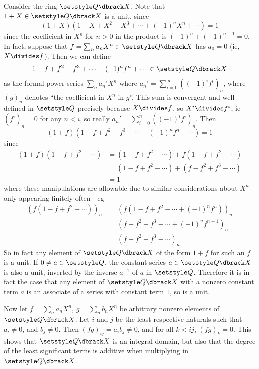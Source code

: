 \documentclass[fleqn,a4paper,11pt]{article}
\begin{document}
Consider the ring \(\Q\dbrack X\). Note that \(1 + X \in \Q\dbrack X\) is a
unit, since
\begin{equation*}
 (1 + X)(1 - X + X^2 - X^3 + \dotsb + (-1)^n X^n + \dotsb) = 1
\end{equation*}
since the coefficient in \(X^n\) for \(n > 0\) in the product is
\((-1)^n + (-1)^{n + 1} = 0\). In fact, suppose that
\(f = \sum_n a_n X^n \in \Q\dbrack X\) has \(a_0 = 0\) (ie, \(X \divides f\)).
Then we can define
\begin{equation*}
 1 - f + f^2 - f^3 + \dotsb + (-1)^n f^n + \dotsb \in \Q\dbrack X
\end{equation*}
as the formal power series \(\sum_n a_n' X^n\) where
\(a_n' = \sum_{i = 0}^\infty ((-1)^i f^i)_n\), where \((g)_n\) denotes ``the
coefficient in \(X^n\) in \(g\)''. This sum is convergent and well-defined in
\(\Q\) precisely because \(X \divides f\), so \(X^i \divides f^i\), ie
\((f^i)_n = 0\) for any \(n < i\), so really
\(a_n' = \sum_{i = 0}^n ((-1)^i f^i)_n\). Then
\begin{equation*}
 (1 + f)(1 - f + f^2 - f^3 + \dotsb + (-1)^n f^n + \dotsb) = 1
\end{equation*}
since
\begin{align*}
 (1 + f)(1 - f + f^2 - \dotsb)
  &= (1 - f + f^2 - \dotsb) + f(1 - f + f^2 - \dotsb) \\
  &= (1 - f + f^2 - \dotsb) + (f - f^2 + f^3 - \dotsb) \\
  &= 1
\end{align*}
where these manipulations are allowable due to similar considerations about
\(X^n\) only appearing finitely often - eg
\begin{align*}
 (f(1 - f + f^2 - \dotsb))_n
  &= (f(1 - f + f^2 - \dotsb + (-1)^n f^n))_n \\
  &= (f - f^2 + f^3 - \dotsb + (-1)^n f^{n + 1})_n \\
  &= (f - f^2 + f^3 - \dotsb)_n
\end{align*}
So in fact any element of \(\Q\dbrack X\) of the form \(1 + f\) for such an
\(f\) is a unit. If \(0 \ne a \in \Q\), the constant series
\(a \in \Q\dbrack X\) is also a unit, inverted by the inverse \(a^{-1}\) of
\(a\) in \(\Q\). Therefore it is in fact the case that any element of
\(\Q\dbrack X\) with a nonzero constant term \(a\) is an associate of a series
with constant term \(1\), so is a unit.

Now let \(f = \sum_n a_n X^n\), \(g = \sum_n b_n X^n\) be arbitrary nonzero
elements of \(\Q\dbrack X\). Let \(i\) and \(j\) be the least respective
naturals such that \(a_i \ne 0\), and \(b_j \ne 0\). Then
\((fg)_{ij} = a_i b_j \ne 0\), and for all \(k < ij\), \((fg)_k = 0\). This
shows that \(\Q\dbrack X\) is an integral domain, but also that the degree of
the least significant terms is additive when multiplying in \(\Q\dbrack X\).
\end{document}
